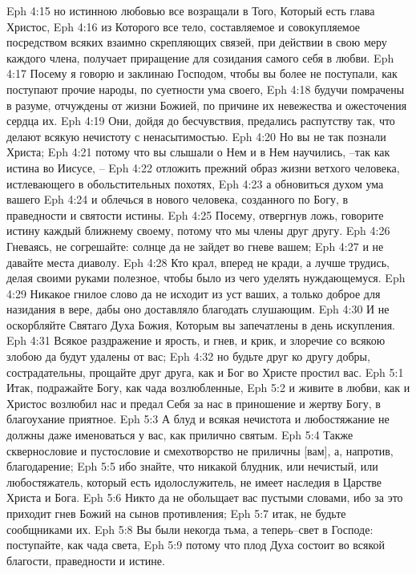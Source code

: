 Eph 4:15  но истинною любовью все возращали в Того, Который есть глава Христос,
Eph 4:16  из Которого все тело, составляемое и совокупляемое посредством всяких взаимно скрепляющих связей, при действии в свою меру каждого члена, получает приращение для созидания самого себя в любви.
Eph 4:17  Посему я говорю и заклинаю Господом, чтобы вы более не поступали, как поступают прочие народы, по суетности ума своего,
Eph 4:18  будучи помрачены в разуме, отчуждены от жизни Божией, по причине их невежества и ожесточения сердца их.
Eph 4:19  Они, дойдя до бесчувствия, предались распутству так, что делают всякую нечистоту с ненасытимостью.
Eph 4:20  Но вы не так познали Христа;
Eph 4:21  потому что вы слышали о Нем и в Нем научились, --так как истина во Иисусе, --
Eph 4:22  отложить прежний образ жизни ветхого человека, истлевающего в обольстительных похотях,
Eph 4:23  а обновиться духом ума вашего
Eph 4:24  и облечься в нового человека, созданного по Богу, в праведности и святости истины.
Eph 4:25  Посему, отвергнув ложь, говорите истину каждый ближнему своему, потому что мы члены друг другу.
Eph 4:26  Гневаясь, не согрешайте: солнце да не зайдет во гневе вашем;
Eph 4:27  и не давайте места диаволу.
Eph 4:28  Кто крал, вперед не кради, а лучше трудись, делая своими руками полезное, чтобы было из чего уделять нуждающемуся.
Eph 4:29  Никакое гнилое слово да не исходит из уст ваших, а только доброе для назидания в вере, дабы оно доставляло благодать слушающим.
Eph 4:30  И не оскорбляйте Святаго Духа Божия, Которым вы запечатлены в день искупления.
Eph 4:31  Всякое раздражение и ярость, и гнев, и крик, и злоречие со всякою злобою да будут удалены от вас;
Eph 4:32  но будьте друг ко другу добры, сострадательны, прощайте друг друга, как и Бог во Христе простил вас.
Eph 5:1  Итак, подражайте Богу, как чада возлюбленные,
Eph 5:2  и живите в любви, как и Христос возлюбил нас и предал Себя за нас в приношение и жертву Богу, в благоухание приятное.
Eph 5:3  А блуд и всякая нечистота и любостяжание не должны даже именоваться у вас, как прилично святым.
Eph 5:4  Также сквернословие и пустословие и смехотворство не приличны [вам], а, напротив, благодарение;
Eph 5:5  ибо знайте, что никакой блудник, или нечистый, или любостяжатель, который есть идолослужитель, не имеет наследия в Царстве Христа и Бога.
Eph 5:6  Никто да не обольщает вас пустыми словами, ибо за это приходит гнев Божий на сынов противления;
Eph 5:7  итак, не будьте сообщниками их.
Eph 5:8  Вы были некогда тьма, а теперь--свет в Господе: поступайте, как чада света,
Eph 5:9  потому что плод Духа состоит во всякой благости, праведности и истине.
